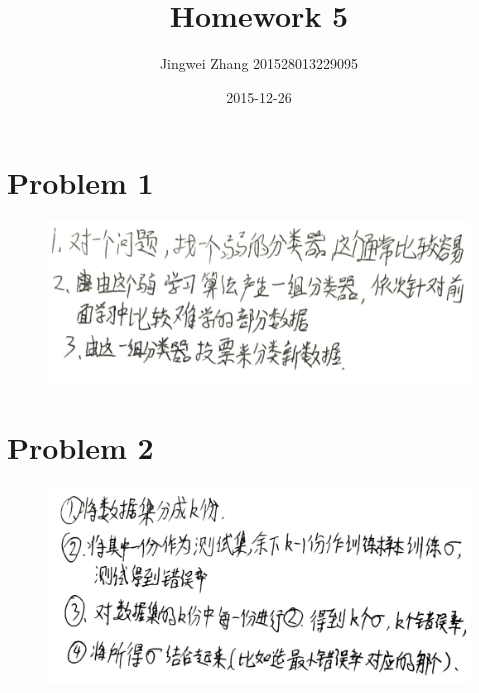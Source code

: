 \documentclass[]{article}
\title{Homework 5}
\date{2015-12-26}
\author{Jingwei Zhang 201528013229095}
\begin{document}
    \maketitle
    \section{Problem 1}
    \begin{figure}[H]
        \centering
        \includegraphics[scale=0.5]{P1.jpg}
    \end{figure}
    \section{Problem 2}
    \begin{figure}[H]
        \centering
        \includegraphics[scale=0.5]{P2.jpg}
    \end{figure}
\end{document}
